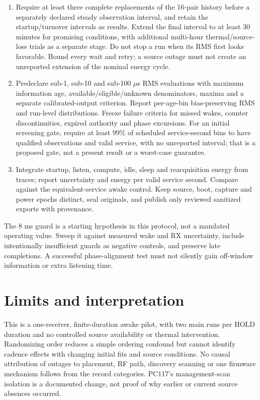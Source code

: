 \documentclass[11pt,letterpaper]{article}
\begin{document}
\begin{enumerate}
\item Require at least three complete replacements of the 16-pair history before a separately declared steady observation interval, and retain the startup/turnover intervals as results. Extend the final interval to at least 30 minutes for promising conditions, with additional multi-hour thermal/source-loss trials as a separate stage. Do not stop a run when its RMS first looks favorable. Bound every wait and retry; a source outage must not create an unreported extension of the nominal energy cycle.
\item Predeclare sub-1, sub-10 and sub-100 $\mu$s RMS evaluations with maximum information age, available/eligible/unknown denominators, maxima and a separate calibrated-output criterion. Report per-age-bin bias-preserving RMS and run-level distributions. Freeze failure criteria for missed wakes, counter discontinuities, expired authority and phase excursions. For an initial screening gate, require at least 99\% of scheduled service-second bins to have qualified observations and valid service, with no unreported interval; that is a proposed gate, not a present result or a worst-case guarantee.
\item Integrate startup, listen, compute, idle, sleep and reacquisition energy from traces; report uncertainty and energy per valid service second. Compare against the equivalent-service awake control. Keep source, boot, capture and power epochs distinct, seal originals, and publish only reviewed sanitized exports with provenance.
\end{enumerate}
The 8 ms guard is a starting hypothesis in this protocol, not a mandated operating value. Sweep it against measured wake and RX uncertainty, include intentionally insufficient guards as negative controls, and preserve late completions. A successful phase-alignment test must not silently gain off-window information or extra listening time.

\section{Limits and interpretation}\label{sec:limits}
This is a one-receiver, finite-duration awake pilot, with two main runs per HOLD duration and no controlled source availability or thermal intervention. Randomizing order reduces a simple ordering confound but cannot identify cadence effects with changing initial fits and source conditions. No causal attribution of outages to placement, RF path, discovery scanning or one firmware mechanism follows from the record categories. PC117's management-scan isolation is a documented change, not proof of why earlier or current source absences occurred.
\end{document}
